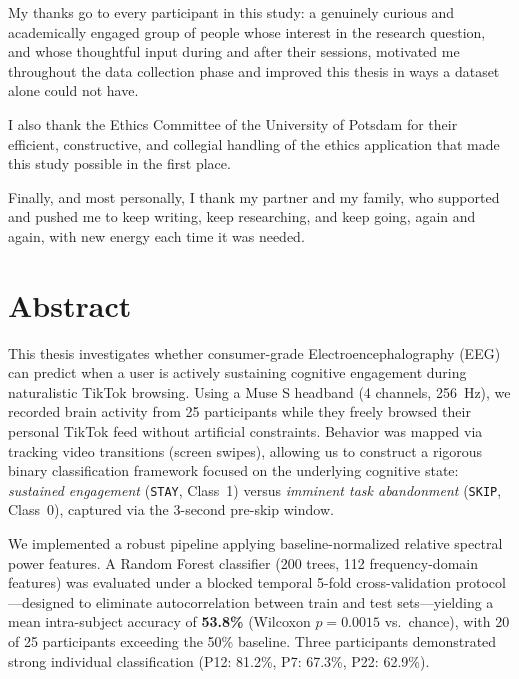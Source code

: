 \documentclass[12pt,a4paper]{report}
\begin{document}
My thanks go to every participant in this study: a genuinely curious and academically engaged group of people whose interest in the research question, and whose thoughtful input during and after their sessions, motivated me throughout the data collection phase and improved this thesis in ways a dataset alone could not have.

I also thank the Ethics Committee of the University of Potsdam for their efficient, constructive, and collegial handling of the ethics application that made this study possible in the first place.

Finally, and most personally, I thank my partner and my family, who supported and pushed me to keep writing, keep researching, and keep going, again and again, with new energy each time it was needed.

\clearpage
{\pagestyle{plain}\tableofcontents\clearpage}

\clearpage

\setcounter{page}{1}

\iffalse
\chapter*{Abstract}
This thesis investigates whether consumer-grade Electroencephalography (EEG) can predict when a user is actively sustaining cognitive engagement during naturalistic TikTok browsing. Using a Muse S headband (4 channels, 256~Hz), we recorded brain activity from 25 participants while they freely browsed their personal TikTok feed without artificial constraints. Behavior was mapped via tracking video transitions (screen swipes), allowing us to construct a rigorous binary classification framework focused on the underlying cognitive state: \textit{sustained engagement} (\texttt{STAY}, Class~1) versus \textit{imminent task abandonment} (\texttt{SKIP}, Class~0), captured via the 3-second pre-skip window.

We implemented a robust pipeline applying baseline-normalized relative spectral power features. A Random Forest classifier (200 trees, 112 frequency-domain features) was evaluated under a blocked temporal 5-fold cross-validation protocol---designed to eliminate autocorrelation between train and test sets---yielding a mean intra-subject accuracy of \textbf{53.8\%} (Wilcoxon $p=0.0015$ vs.\ chance), with 20 of 25 participants exceeding the 50\% baseline. Three participants demonstrated strong individual classification (P12: 81.2\%, P7: 67.3\%, P22: 62.9\%).
\end{document}
